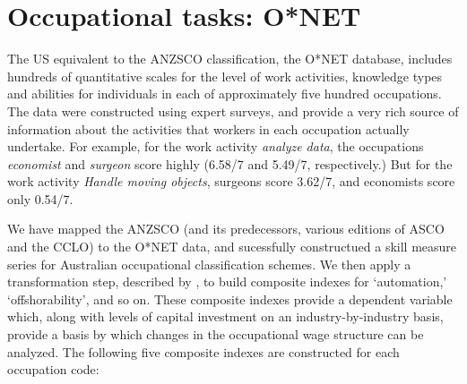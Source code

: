 \section{Occupational tasks: O*NET}\label{sec:onet}

The US equivalent to the ANZSCO classification, the O*NET database, includes hundreds of quantitative scales for the level of work activities, knowledge types and abilities for individuals in each of approximately five hundred occupations. The data were constructed using expert surveys, and provide a very rich source of information about the activities that workers in each occupation actually undertake. For example, for the work activity {\em analyze data}, the occupations {\em economist} and {\em surgeon} score highly (6.58/7 and 5.49/7, respectively.) But for the work activity {\em Handle moving objects}, surgeons score 3.62/7, and economists score only 0.54/7.

We have mapped the ANZSCO (and its predecessors, various editions of ASCO and the CCLO) to the O*NET data, and sucessfully constructued a skill measure series for Australian occupational classification schemes. We then apply a transformation step, described by \citet{Firpo2011}, to build composite indexes for `automation,' `offshorability', and so on. These composite indexes provide a dependent variable which, along with levels of capital investment on an industry-by-industry basis, provide a basis by which changes in the occupational wage structure can be analyzed. The following five composite indexes are constructed for each occupation code:

